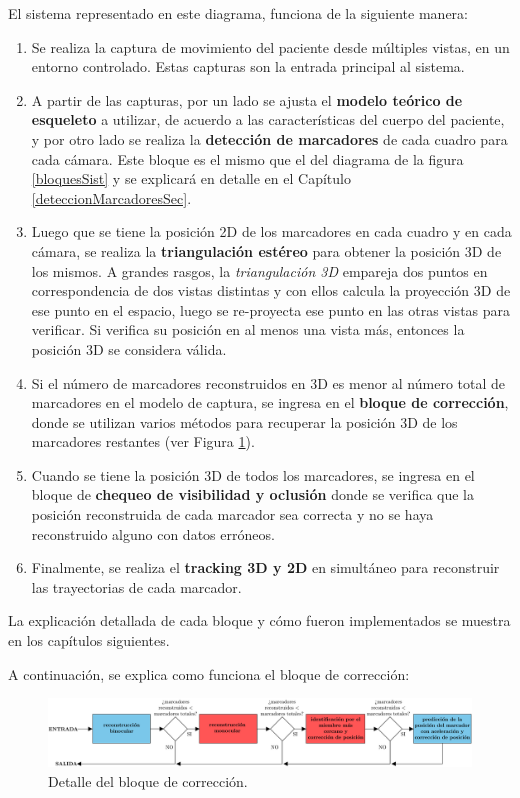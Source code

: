 El sistema representado en este diagrama, funciona de la siguiente manera:

\begin{enumerate}
\item Se realiza la captura de movimiento del paciente desde múltiples vistas, en un entorno controlado. Estas capturas son la entrada principal al sistema.
\item A partir de las capturas, por un lado se ajusta el \textbf{modelo teórico de esqueleto} a utilizar, de acuerdo a las características del cuerpo del paciente, y por otro lado se realiza la \textbf{detección de marcadores} de cada cuadro para cada cámara. Este bloque es el mismo que el del diagrama de la figura \ref{bloquesSist} y se explicará en detalle en el Capítulo \ref{deteccionMarcadoresSec}.
\item Luego que se tiene la posición 2D de los marcadores en cada cuadro y en cada cámara, se realiza la \textbf{triangulación estéreo} para obtener la posición 3D de los mismos. A grandes rasgos, la \emph{triangulación 3D} empareja dos puntos en correspondencia de dos vistas distintas y con ellos calcula la proyección 3D de ese punto en el espacio, luego se re-proyecta ese punto en las otras vistas para verificar. Si verifica su posición en al menos una vista más, entonces la posición 3D se considera válida.
\item Si el número de marcadores reconstruidos en 3D es menor al número total de marcadores en el modelo de captura, se ingresa en el \textbf{bloque de corrección}, donde se utilizan varios métodos para recuperar la posición 3D de los marcadores restantes (ver Figura \ref{fig:bloqCorr}). 
\item Cuando se tiene la posición 3D de todos los marcadores, se ingresa en el bloque de \textbf{chequeo de visibilidad y oclusión} donde se verifica que la posición reconstruida de cada marcador sea correcta y no se haya reconstruido alguno con datos erróneos.
\item Finalmente, se realiza el \textbf{tracking 3D y 2D} en simultáneo para reconstruir las trayectorias de cada marcador.
\end{enumerate}

La explicación detallada de cada bloque y cómo fueron implementados se muestra en los capítulos siguientes.

A continuación, se explica como funciona el bloque de corrección:

\begin{figure}[H]
\hspace{-1cm}
\includegraphics[scale=0.22]{img/Sistema_completo/BloquesDeCorreccion}
\caption{Detalle del bloque de corrección.}
\label{fig:bloqCorr}
\end{figure}

